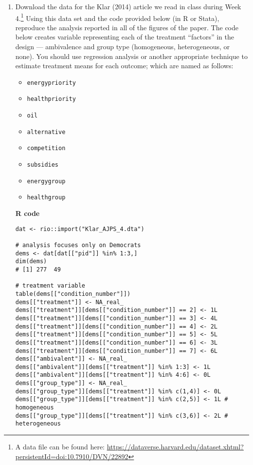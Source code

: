 \documentclass[a4paper]{exam}
\begin{document}
\begin{enumerate}
\begin{enumerate}
\begin{solution}
	\end{solution}
	
	\end{enumerate}

\item Download the data for the Klar (2014) article we read in class during Week 4.\footnote{A data file can be found here: \url{https://dataverse.harvard.edu/dataset.xhtml?persistentId=doi:10.7910/DVN/22892}} Using this data set and the code provided below (in R or Stata), reproduce the analysis reported in all of the figures of the paper. The code below creates variable representing each of the treatment ``factors'' in the design --- ambivalence and group type (homogeneous, heterogeneous, or none). You should use regression analysis or another appropriate technique to estimate treatment means for each outcome; which are named as follows:

\begin{itemize}
\item \texttt{energypriority}
\item \texttt{healthpriority}
\item \texttt{oil}
\item \texttt{alternative}
\item \texttt{competition}
\item \texttt{subsidies}
\item \texttt{energygroup}
\item \texttt{healthgroup}
\end{itemize}

\textbf{R code}

\begin{verbatim}
dat <- rio::import("Klar_AJPS_4.dta")

# analysis focuses only on Democrats
dems <- dat[dat[["pid"]] %in% 1:3,]
dim(dems)
# [1] 277  49

# treatment variable
table(dems[["condition_number"]])
dems[["treatment"]] <- NA_real_
dems[["treatment"]][dems[["condition_number"]] == 2] <- 1L
dems[["treatment"]][dems[["condition_number"]] == 3] <- 4L
dems[["treatment"]][dems[["condition_number"]] == 4] <- 2L
dems[["treatment"]][dems[["condition_number"]] == 5] <- 5L
dems[["treatment"]][dems[["condition_number"]] == 6] <- 3L
dems[["treatment"]][dems[["condition_number"]] == 7] <- 6L
dems[["ambivalent"]] <- NA_real_
dems[["ambivalent"]][dems[["treatment"]] %in% 1:3] <- 1L
dems[["ambivalent"]][dems[["treatment"]] %in% 4:6] <- 0L
dems[["group_type"]] <- NA_real_
dems[["group_type"]][dems[["treatment"]] %in% c(1,4)] <- 0L
dems[["group_type"]][dems[["treatment"]] %in% c(2,5)] <- 1L # homogeneous
dems[["group_type"]][dems[["treatment"]] %in% c(3,6)] <- 2L # heterogeneous
\end{verbatim}


\end{enumerate}
\end{document}
